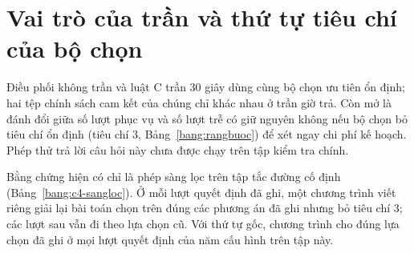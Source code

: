 
\section{Vai trò của trần và thứ tự tiêu chí của bộ chọn}
\label{muc:c4-vaitro}

Điều phối không trần và luật C trần 30 giây dùng cùng bộ chọn ưu tiên ổn định; hai tệp chính sách cam kết của chúng
chỉ khác nhau ở trần giờ trả. Còn mở là đánh đổi giữa số lượt phục vụ và số lượt trễ có giữ nguyên không nếu bộ chọn
bỏ tiêu chí ổn định (tiêu chí 3, Bảng~\ref{bang:rangbuoc}) để xét ngay chi phí kế hoạch. Phép thử trả lời câu hỏi này
chưa được chạy trên tập kiểm tra chính.

Bằng chứng hiện có chỉ là phép sàng lọc trên tập tắc đường cố định (Bảng~\ref{bang:c4-sangloc}). Ở mỗi lượt quyết định
đã ghi, một chương trình viết riêng giải lại bài toán chọn trên đúng các phương án đã ghi nhưng bỏ tiêu chí 3; các lượt
sau vẫn đi theo lựa chọn cũ. Với thứ tự gốc, chương trình cho đúng lựa chọn đã ghi ở mọi lượt quyết định của năm cấu
hình trên tập này.

